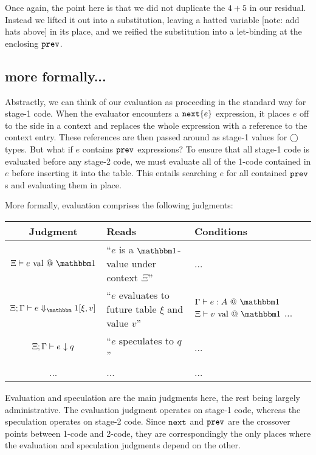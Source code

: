 Once again, the point here is that we did not duplicate the $4+5$ in our residual.  
Instead we lifted it out into a substitution, leaving a hatted variable [note: add hats above] in its place,
and we reified the substitution into a let-binding at the enclosing ${\tt prev}$.

\subsection{more formally...}

Abstractly, we can think of our evaluation as proceeding in the standard way for stage-1 code. When the evaluator encounters a ${\tt next} \{e\}$ expression, it places $e$ off to the side in a context and replaces the whole expression with a reference to the context entry.  These references are then passed around as stage-1 values for $\bigcirc$ types.  But what if $e$ contains ${\tt prev}$ expressions?  To ensure that all stage-1 code is evaluated before any stage-2 code, we must evaluate all of the 1-code contained in $e$ before inserting it into the table.  This entails searching $e$ for all contained ${\tt prev}$s and evaluating them in place.  

More formally, evaluation comprises the following judgments:

\begin{center}
\begin{tabular}{|c|p{2.5cm}|p{2.5cm}|} \hline
Judgment & Reads & Conditions \\ \hline 
$\isvalone e$ & ``$e$ is a $\bbone$-value under context $\Xi$'' & ... \\ \hline 
$\diaonesub$ & ``$e$ evaluates to future table $\xi$ and value $v$'' 
& $\typesone e A$ 
	\newline $\isvalone v$ 
	\newline ... \\ \hline 
${\Xi;\Gamma} \vdash {e_{}} \downarrow {q_{}}$ & ``$e$ speculates to $q$'' & ... \\ \hline 
...&...&... \\ \hline
\end{tabular}
\end{center}

Evaluation and speculation are the main judgments here, the rest being largely administrative.  The evaluation judgment operates on stage-1 code, whereas the speculation operates on stage-2 code.  Since ${\tt next}$ and ${\tt prev}$ are the crossover points between 1-code and 2-code, they are correspondingly the only places where the evaluation and speculation judgments depend on the other. 



